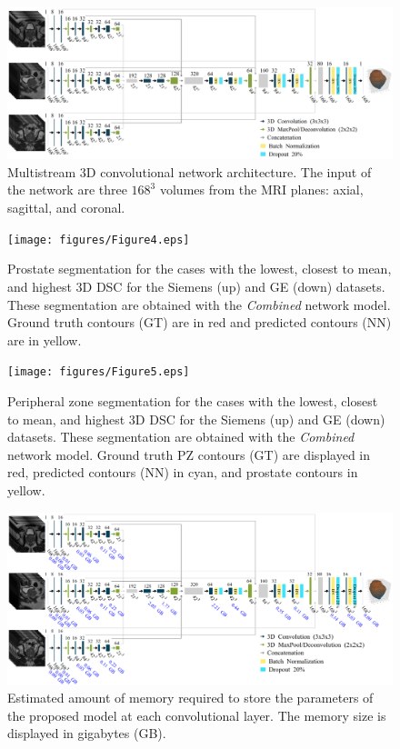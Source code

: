 \begin{figure}[ht]
    \centering
    \includegraphics[totalheight=.282\textheight]{figures/Figure3.eps}
    \caption{Multistream 3D convolutional network architecture. The input of the network are three $168^3$ volumes from the MRI planes: axial, sagittal, and coronal. }
    \label{fig:fig_3}
\end{figure}

\begin{figure}[ht]
    \centering
    \texttt{[image: figures/Figure4.eps]}
    \caption{Prostate segmentation for the cases with the lowest, closest to mean, and highest 3D DSC for the Siemens (up) and GE (down) datasets. These segmentation are obtained with the \emph{Combined} network model. Ground
    truth contours (GT) are in red and predicted  contours  (NN) are in yellow. }
    \label{fig:resseg}
\end{figure} 

\begin{figure}[ht]
    \centering
    \texttt{[image: figures/Figure5.eps]}
    \caption{Peripheral zone segmentation for the cases with the lowest, closest to mean, and highest 3D DSC for the Siemens (up) and GE (down) datasets. These segmentation are obtained with the \emph{Combined} network model. 
    Ground truth PZ contours (GT) are displayed in red, predicted  contours (NN) in cyan, and prostate contours in yellow.
    }
    \label{fig:ressegpz}
\end{figure} 

\begin{figure}[ht]
    \centering
    \includegraphics[totalheight=.32\textheight]{figures/Figure6.eps}
    \caption{Estimated amount of memory required to store the parameters of the proposed model at each convolutional layer. The memory size is displayed in gigabytes (GB). }
    \label{fig:nn_size}
\end{figure}